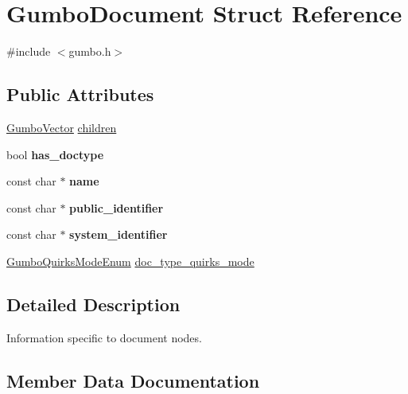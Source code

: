 \hypertarget{struct_gumbo_document}{}\section{Gumbo\+Document Struct Reference}
\label{struct_gumbo_document}


{\ttfamily \#include $<$gumbo.\+h$>$}

\subsection*{Public Attributes}
\begin{DoxyCompactItemize}
\item 
\mbox{\hyperlink{struct_gumbo_vector}{Gumbo\+Vector}} \mbox{\hyperlink{struct_gumbo_document_ac4e8d4b3f088d46a0172149c08a0e5d3}{children}}
\item 
\mbox{\label{struct_gumbo_document_a4a0b3c6f0e732073ec90de99a4bc5180}} 
bool {\bfseries has\+\_\+doctype}
\item 
\mbox{\label{struct_gumbo_document_ab8ee55b73ff2546cacfeb9ccd116ca08}} 
const char $\ast$ {\bfseries name}
\item 
\mbox{\label{struct_gumbo_document_ad5437a289154cd970fa64fbc9c4fbfc8}} 
const char $\ast$ {\bfseries public\+\_\+identifier}
\item 
\mbox{\label{struct_gumbo_document_af7e13d360910e8d8b1424c3ae40ac582}} 
const char $\ast$ {\bfseries system\+\_\+identifier}
\item 
\mbox{\hyperlink{gumbo_8h_aa0cbbfcc7ab2be48ac329ef7e76ff135}{Gumbo\+Quirks\+Mode\+Enum}} \mbox{\hyperlink{struct_gumbo_document_aa8135059f582a2c8309dcdd66eef7772}{doc\+\_\+type\+\_\+quirks\+\_\+mode}}
\end{DoxyCompactItemize}


\subsection{Detailed Description}
Information specific to document nodes. 

\subsection{Member Data Documentation}
\mbox{\label{struct_gumbo_document_ac4e8d4b3f088d46a0172149c08a0e5d3}} 
